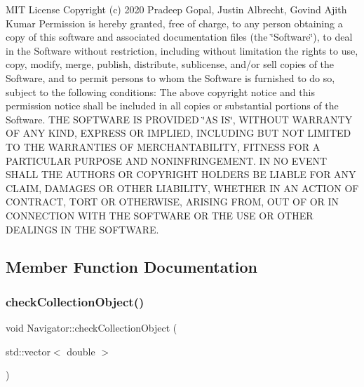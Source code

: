 M\+IT License Copyright (c) 2020 Pradeep Gopal, Justin Albrecht, Govind Ajith Kumar Permission is hereby granted, free of charge, to any person obtaining a copy of this software and associated documentation files (the \char`\"{}\+Software\char`\"{}), to deal in the Software without restriction, including without limitation the rights to use, copy, modify, merge, publish, distribute, sublicense, and/or sell copies of the Software, and to permit persons to whom the Software is furnished to do so, subject to the following conditions\+: The above copyright notice and this permission notice shall be included in all copies or substantial portions of the Software. T\+HE S\+O\+F\+T\+W\+A\+RE IS P\+R\+O\+V\+I\+D\+ED \char`\"{}\+A\+S I\+S\char`\"{}, W\+I\+T\+H\+O\+UT W\+A\+R\+R\+A\+N\+TY OF A\+NY K\+I\+ND, E\+X\+P\+R\+E\+SS OR I\+M\+P\+L\+I\+ED, I\+N\+C\+L\+U\+D\+I\+NG B\+UT N\+OT L\+I\+M\+I\+T\+ED TO T\+HE W\+A\+R\+R\+A\+N\+T\+I\+ES OF M\+E\+R\+C\+H\+A\+N\+T\+A\+B\+I\+L\+I\+TY, F\+I\+T\+N\+E\+SS F\+OR A P\+A\+R\+T\+I\+C\+U\+L\+AR P\+U\+R\+P\+O\+SE A\+ND N\+O\+N\+I\+N\+F\+R\+I\+N\+G\+E\+M\+E\+NT. IN NO E\+V\+E\+NT S\+H\+A\+LL T\+HE A\+U\+T\+H\+O\+RS OR C\+O\+P\+Y\+R\+I\+G\+HT H\+O\+L\+D\+E\+RS BE L\+I\+A\+B\+LE F\+OR A\+NY C\+L\+A\+IM, D\+A\+M\+A\+G\+ES OR O\+T\+H\+ER L\+I\+A\+B\+I\+L\+I\+TY, W\+H\+E\+T\+H\+ER IN AN A\+C\+T\+I\+ON OF C\+O\+N\+T\+R\+A\+CT, T\+O\+RT OR O\+T\+H\+E\+R\+W\+I\+SE, A\+R\+I\+S\+I\+NG F\+R\+OM, O\+UT OF OR IN C\+O\+N\+N\+E\+C\+T\+I\+ON W\+I\+TH T\+HE S\+O\+F\+T\+W\+A\+RE OR T\+HE U\+SE OR O\+T\+H\+ER D\+E\+A\+L\+I\+N\+GS IN T\+HE S\+O\+F\+T\+W\+A\+RE. 

\subsection{Member Function Documentation}
\mbox{\label{class_navigator_a7564ed301b924f2400b646612a52fb67}} 
\subsubsection{\texorpdfstring{check\+Collection\+Object()}{checkCollectionObject()}}
{\footnotesize\ttfamily void Navigator\+::check\+Collection\+Object (\begin{DoxyParamCaption}\item[{std\+::vector$<$ double $>$}]{ }\end{DoxyParamCaption})}



